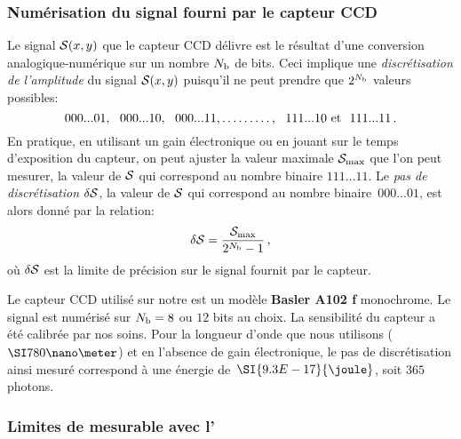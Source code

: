 \subsubsection{Numérisation du signal fourni par le capteur CCD}\label{sec:SignalCCD}
	Le signal ${\mathcal{S}}(x,y)$ que le capteur CCD délivre est le résultat d'une conversion analogique-numérique sur un nombre ${N_{\rm b}}$ de bits. Ceci implique une \emph{discrétisation de l'amplitude} du signal ${\mathcal{S}}(x,y)$ puisqu'il ne peut prendre que $2^{{N_{\rm b}}}$ valeurs possibles:%
\[
000...01,~~000...10,~~000...11,\ldots\ldots\ldots,~~111...10~\text{et}~~111...11
\, .
\] 
%
\noindent En pratique, en utilisant un gain électronique ou en jouant sur le temps d'exposition du capteur, on peut ajuster la valeur maximale ${\mathcal{S}_{\rm max}}$ que l'on peut mesurer, \cad la valeur de ${\mathcal{S}}$ qui correspond au nombre binaire $111...11$. Le \emph{pas de discrétisation} ${\delta \mathcal{S}}$, \cad la valeur de ${\mathcal{S}}$ qui correspond au nombre binaire~$000...01$, est alors donné par la relation: 
	\[
	\SignalPas = \frac{\SignalMax}{2^{\Nbit}-1} %
	\virguleformule
	\]
où ${\delta \mathcal{S}}$ est la limite de précision sur le signal fournit par le capteur.

\ApplicationNumerique
{
Le capteur CCD utilisé sur notre \setup est un modèle \textbf{Basler A102 f} monochrome. %
Le signal est numérisé sur ${N_{\rm b}}=8$ ou $12$ bits au choix. La sensibilité du capteur a été calibrée par nos soins. 
 Pour la longueur d'onde que nous utilisons ($\nm{780}$) et en l'absence de gain électronique, le pas de discrétisation ainsi mesuré correspond à une énergie de~$\SI{9.3E-17}{\joule}$, soit $365$ photons.
}

\subsubsection{Limites de \do mesurable avec l'\ipa}

